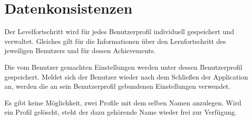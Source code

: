 \section{Datenkonsistenzen}

\begin{requirements}
  		
  	 Der Levelfortschritt wird für jedes Benutzerprofil individuell gespeichert und verwaltet. Gleiches gilt für die Informationen über den Lernfortschritt des jeweiligen Benutzers und für dessen Achievements.
  		
	 Die vom Benutzer gemachten Einstellungen werden unter dessen Benutzerprofil gespeichert. Meldet sich der Benutzer wieder nach dem Schließen der Application an, werden die an sein Benutzerprofil gebundenen Einstellungen verwendet.
	
	 Es gibt keine Möglichkeit, zwei Profile mit dem selben Namen anzulegen. Wird ein Profil gelöscht, steht der dazu gehörende Name wieder frei zur Verfügung.

\end{requirements}	
  		
